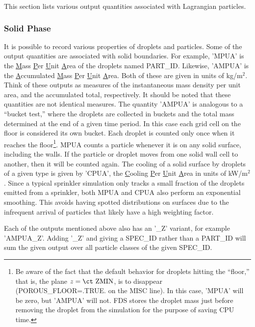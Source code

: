 \documentclass[11pt]{book}
\begin{document}
This section lists various output quantities associated with Lagrangian particles.

\subsubsection{Solid Phase}

It is possible to record various properties of droplets and particles. Some of the output quantities are associated with solid boundaries. For example,
{\ct 'MPUA'} is the \underline{M}ass \underline{P}er \underline{U}nit \underline{A}rea of the droplets named {\ct PART\_ID}.
Likewise, {\ct 'AMPUA'} is the \underline{A}ccumulated \underline{M}ass \underline{P}er \underline{U}nit \underline{A}rea.
Both of these are given in units of kg/m$^2$. Think of these outputs as measures of the instantaneous mass density per unit area,
and the accumulated total, respectively.  It should be noted that these quantities are not identical measures.  The quantity {\ct 'AMPUA'} is analogous to a ``bucket test,'' where the droplets are collected in buckets and the total mass determined at the end of a given time period.  In this case each grid cell on the floor is considered its own bucket.  Each droplet is counted only once when it reaches the floor\footnote{Be aware of the fact that the default behavior for droplets hitting the ``floor,'' that is, the plane $z=\hbox{\ct ZMIN}$, is to disappear ({\ct POROUS\_FLOOR=.TRUE.} on the {\ct MISC} line). In this case, {\ct 'MPUA'} will be zero, but {\ct 'AMPUA'} will not. FDS stores the droplet mass just before removing the droplet from the simulation for the purpose of saving CPU time.}. MPUA counts a particle whenever it is on any solid surface, including the walls.  If the particle or droplet moves from one solid wall
cell to another, then it will be counted again.  The cooling of a solid surface by droplets of a
given type is given by {\ct 'CPUA'}, the \underline{C}ooling \underline{P}er \underline{U}nit \underline{A}rea in units of kW/m$^2$.  Since a typical sprinkler simulation only tracks a small fraction of the droplets emitted from a sprinkler, both MPUA and CPUA also perform an exponential smoothing.  This avoids having spotted distributions on surfaces due to the infrequent arrival of particles that likely have a high weighting factor.

Each of the outputs mentioned above also has an {\ct '\_Z'} variant, for example {\ct 'AMPUA\_Z'}.  Adding {\ct '\_Z'} and giving a {\ct SPEC\_ID} rather than a {\ct PART\_ID} will sum the given output over all particle classes of the given {\ct SPEC\_ID}.
\end{document}
